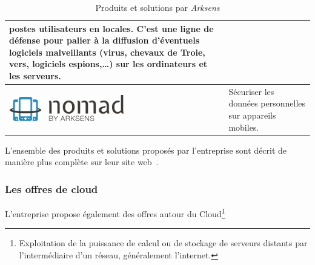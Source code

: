 \documentclass[a4paper,10pt, twoside]{report}
\begin{document}
\begin{spacing}{1.2}
\begin{table}[h!]
\begin{tabular}{m{6cm}m{6cm}}
    postes utilisateurs en locales. C'est une ligne de d\'efense pour palier
    \`a la diffusion d'\'eventuels logiciels malveillants (virus, chevaux de
    Troie, vers, logiciels espions,\ldots{}) sur les ordinateurs et les
    serveurs.\\
    \hline
    \includegraphics[width=5cm, fbox]{produits/nomad.png} & S\'ecuriser les
    donn\'ees personnelles sur appareils mobiles.\\
    \hline
  \end{tabular}
  \caption{\label{tabProduits} Produits et solutions par \textit{Arksens}}
\end{table}

L'ensemble des produits et solutions propos\'es par l'entreprise sont d\'ecrit
de mani\`ere plus compl\`ete sur leur site web~\cite{refArksens}.

\subsubsection{Les offres de cloud}
L'entreprise propose \'egalement des offres autour du Cloud\footnote{
Exploitation de la puissance de calcul ou de stockage de serveurs distants
par l'interm\'ediaire d'un r\'eseau, g\'en\'eralement l'internet.}


\end{spacing}
\end{document}
